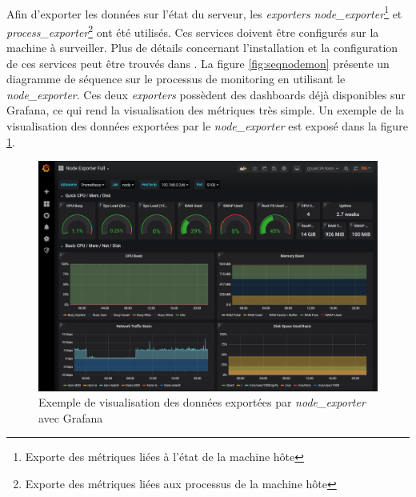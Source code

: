 ~

\noindent
Afin d’exporter les données sur l’état du serveur, les \textit{exporters} \textit{node\_exporter}\footnote{Exporte des métriques liées à l'état de la machine hôte} et \textit{process\_exporter}\footnote{Exporte des métriques liées aux processus de la machine hôte} ont été utilisés. Ces services doivent être configurés sur la machine à surveiller. Plus de détails concernant l’installation et la configuration de ces services peut être trouvés dans \cite{node_exporter_github, process_exporter_github, prometheus_exporters}. La figure \ref{fig:seqnodemon} présente un diagramme de séquence sur le processus de monitoring en utilisant le \textit{node\_exporter}. Ces deux \textit{exporters} possèdent des dashboards déjà disponibles sur Grafana, ce qui rend la visualisation des métriques très simple. Un exemple de la visualisation des données exportées par le \textit{node\_exporter} est exposé dans la figure \ref{fig:grafnode}.


\begin{figure}
  \includegraphics[width=\textwidth]{img/app/grafana_example.png}
  \caption{Exemple de visualisation des données exportées par \textit{node\_exporter} avec Grafana}
  \label{fig:grafnode}
\end{figure}


